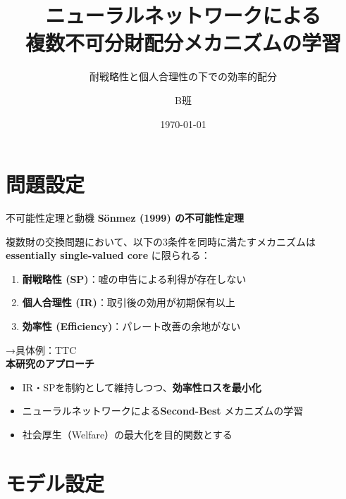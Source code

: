 \documentclass[aspectratio=169,12pt]{beamer}
\title{ニューラルネットワークによる\\複数不可分財配分メカニズムの学習}
\subtitle{耐戦略性と個人合理性の下での効率的配分}
\author{B班}
\date{\today}
\begin{document}
\begin{frame}
\titlepage
\end{frame}

\section{問題設定}

\begin{frame}{不可能性定理と動機}
\textbf{Sönmez (1999) の不可能性定理}

複数財の交換問題において、以下の3条件を同時に満たすメカニズムは\\
\textbf{essentially single-valued core} に限られる：

\begin{enumerate}
    \item \textbf{耐戦略性 (SP)}：嘘の申告による利得が存在しない
    \item \textbf{個人合理性 (IR)}：取引後の効用が初期保有以上
    \item \textbf{効率性 (Efficiency)}：パレート改善の余地がない
\end{enumerate}
→具体例：TTC
\vspace{0.3cm}
\\\textbf{本研究のアプローチ}
\begin{itemize}
    \item IR・SPを制約として維持しつつ、\textbf{効率性ロスを最小化}
    \item ニューラルネットワークによる\textbf{Second-Best} メカニズムの学習
    \item 社会厚生（Welfare）の最大化を目的関数とする
\end{itemize}
\end{frame}

\section{モデル設定}
\end{document}
